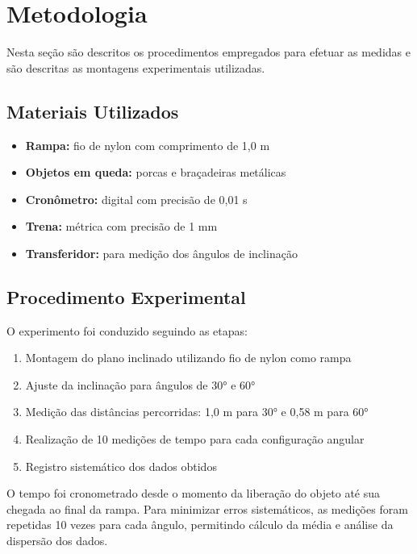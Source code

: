 \documentclass[a4paper, 12pt]{article}
\begin{document}

\section{Metodologia}
Nesta seção são descritos os procedimentos empregados para efetuar as medidas e são descritas as montagens experimentais utilizadas.

\subsection{Materiais Utilizados}
\begin{itemize}
	\item \textbf{Rampa:} fio de nylon com comprimento de 1,0 m
	\item \textbf{Objetos em queda:} porcas e braçadeiras metálicas
	\item \textbf{Cronômetro:} digital com precisão de 0,01 s
	\item \textbf{Trena:} métrica com precisão de 1 mm
	\item \textbf{Transferidor:} para medição dos ângulos de inclinação
\end{itemize}

\subsection{Procedimento Experimental}
O experimento foi conduzido seguindo as etapas:
\begin{enumerate}
	\item Montagem do plano inclinado utilizando fio de nylon \newline como rampa
	\item Ajuste da inclinação para ângulos de 30° e 60°
	\item Medição das distâncias percorridas: 1,0 m para 30° e 0,58 m para 60°
	\item Realização de 10 medições de tempo para cada configuração angular
	\item Registro sistemático dos dados obtidos
\end{enumerate}

O tempo foi cronometrado desde o momento da liberação do objeto até sua chegada ao final da rampa. Para minimizar erros sistemáticos, as medições foram repetidas 10 vezes para cada ângulo, permitindo cálculo da média e análise da dispersão dos dados.
\end{document}
